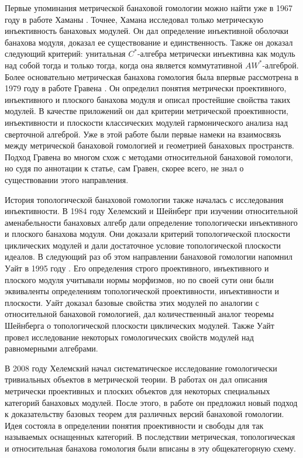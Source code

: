 Первые упоминания метрической банаховой гомологии можно найти уже в 1967 году в
работе Хаманы  . Точнее, Хамана исследовал только
метрическую инъективность банаховых модулей. Он дал определение инъективной
оболочки банахова модуля, доказал ее существование и единственность. Также он
доказал следующий критерий: унитальная $C^*$-алгебра метрически инъективна как
модуль над собой тогда и только тогда, когда она является коммутативной
$AW^*$-алгеброй. Более основательно метрическая банахова гомология была впервые
рассмотрена в 1979 году в работе Гравена  . Он
определил понятия метрически проективного, инъективного и плоского банахова
модуля и описал простейшие свойства таких модулей. В качестве приложений он дал
критерии метрической проективности, инъективности и плоскости классических
модулей гармонического анализа над сверточной алгеброй. Уже в этой работе были
первые намеки на взаимосвязь между метрической банаховой гомологией и геометрией
банаховых пространств. Подход Гравена во многом схож с методами относительной
банаховой гомологи, но судя по аннотации к статье, сам Гравен, скорее всего, не
знал о существовании этого направления.

История топологической банаховой гомологии также началась с исследования
инъективности. В 1984 году Хелемский и Шейнберг
 при изучении относительной
аменабельности банаховых алгебр дали определение топологически инъективного и
плоского банахова модуля. Они доказали критерий топологической плоскости
циклических модулей и дали достаточное условие топологической плоскости идеалов.
В следующий раз об этом направлении банаховой гомологии напомнил Уайт в 1995
году  . Его определения строго проективного,
инъективного и плоского модуля учитывали нормы морфизмов, но по своей сути они
были эквиваленты определениям топологической проективности, инъективности и
плоскости. Уайт доказал базовые свойства этих модулей по аналогии с
относительной банаховой гомологией, дал количественный аналог теоремы Шейнберга
о топологической плоскости циклических модулей. Также Уайт провел исследование
некоторых гомологических свойств модулей над равномерными алгебрами.

В 2008 году Хелемский начал систематическое исследование гомологически
тривиальных объектов в метрической теории. В работах
он дал описания метрически проективных и плоских объектов для некоторых
специальных категорий банаховых модулей. После этого, в работе
 он предложил новый подход к доказательству базовых
теорем для различных версий банаховой гомологии. Идея состояла в определении
понятия проективности и свободы для так называемых оснащенных категорий. В
последствии метрическая, топологическая и относительная банахова гомология были
вписаны в эту общекатегорную схему.

